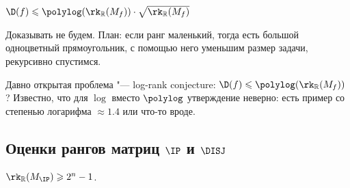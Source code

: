 \begin{theorem}[Lovett, 2013]
$\D(f)\leqslant \polylog(\rk_\mathbb{R}(M_f))\cdot \sqrt{\rk_\mathbb{R}(M_f)}$
\end{theorem}
Доказывать не будем.
План: если ранг маленький, тогда есть большой одноцветный прямоугольник, с помощью него уменьшим размер задачи, рекурсивно спустимся.

Давно открытая проблема "--- log-rank conjecture: $\D(f)\leqslant \polylog(\rk_\mathbb{R}(M_f))$?
Известно, что для $\log$ вместо $\polylog$ утверждение неверно: есть пример со степенью логарифма $\approx 1.4$ или что-то вроде.

\subsection{Оценки рангов матриц \texorpdfstring{$\IP$}{IP} и \texorpdfstring{$\DISJ$}{DISJ}}

\begin{theorem}
\label{rk(M-IP) lower bound}
$\rk_{\mathbb{R}}(M_{\IP}) \geqslant 2^n - 1$.
\end{theorem}


